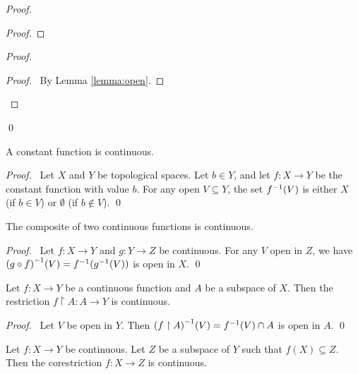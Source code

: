\begin{proof}
\begin{proof}
    \end{proof}
    \begin{proof}
        \qedstep
        \begin{proof}
            \pf\ By Lemma \ref{lemma:open}.
        \end{proof}
    \end{proof}
    \qed
\end{proof}

\begin{theorem}
    A constant function is continuous.
\end{theorem}

\begin{proof}
    \pf\ Let $X$ and $Y$ be topological spaces. Let $b \in Y$, and let $f : X \rightarrow Y$ be the constant
    function with value $b$. For any open $V \subseteq Y$, the set ${f}^{-1}(V)$ is either $X$ (if $b \in V$)
    or $\emptyset$ (if $b \notin V$). \qed
\end{proof}

\begin{theorem}
    \label{theorem:continuous_composite}
    The composite of two continuous functions is continuous.
\end{theorem}

\begin{proof}
    \pf\ Let $f : X \rightarrow Y$ and $g : Y \rightarrow Z$ be continuous. For any $V$ open in $Z$,
    we have ${(g \circ f)}^{-1}(V) = {f}^{-1}({g}^{-1}(V))$ is open in $X$. \qed
\end{proof}

\begin{theorem}
    \label{theorem:continuous_restriction}
    Let $f : X \rightarrow Y$ be a continuous function and $A$ be a subspace of $X$. Then the restriction
    $f \restriction A : A \rightarrow Y$ is continuous.
\end{theorem}

\begin{proof}
    \pf\ Let $V$ be open in $Y$. Then ${(f \restriction A)}^{-1}(V) = {f}^{-1}(V) \cap A$ is open in $A$. \qed
\end{proof}

\begin{theorem}
    Let $f : X \rightarrow Y$ be continuous. Let $Z$ be a subspace of $Y$ such that $f(X) \subseteq Z$. Then
    the corestriction $f : X \rightarrow Z$ is continuous.
\end{theorem}

